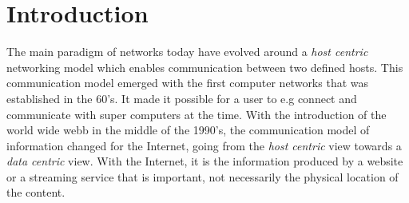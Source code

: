 \section{Introduction}





%
The main paradigm of networks today have evolved around a \textit{host centric} networking model which enables communication between two defined hosts. This communication model emerged with the first computer networks that was established in the 60's. It made it possible for a user to e.g connect and communicate with super computers at the time.
With the introduction of the world wide webb in the middle of the 1990's, the communication model of information changed for the Internet, going from the \textit{host centric} view towards a \textit{data centric} view. With the Internet, it is the information produced by a website or a streaming service that is important, not necessarily the physical location of the content.

